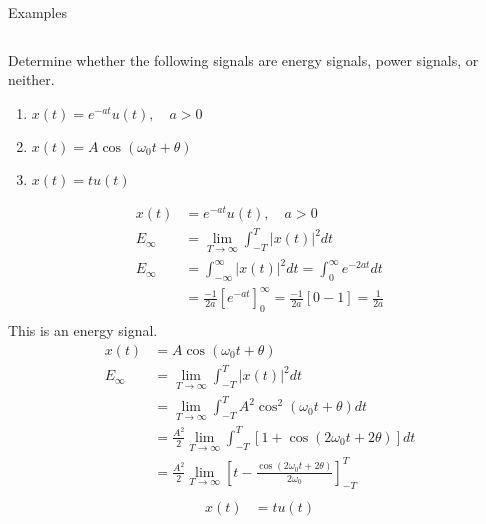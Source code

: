 \begin{frame}{Examples}
    \begin{columns}[t]
        \begin{column}{0.5\textwidth}
            Determine whether the following signals are energy signals, power signals, or neither.
            \begin{enumerate}[<alert@+>]
                \item $x(t) = e^{-at}u(t), \quad a>0$
                \item $x(t) = A\cos(\omega_0t+\theta)$
                \item $x(t) = tu(t)$
            \end{enumerate}
            \vspace{-0.2in}
            \begin{overprint}
                \begin{align*}
                    x(t) &= e^{-at}u(t), \quad a>0\\
                    E_\infty &=  \lim_{T\rightarrow \infty}\int_{-T}^{T}|x(t)|^2dt\\
                    E_\infty &=  \int_{-\infty}^{\infty}|x(t)|^2dt =  \int_{0}^{\infty}e^{-2at}dt\\
                    &= \frac{-1}{2a}\left[e^{-at}\right]_0^\infty = \frac{-1}{2a}[0 -1] = \frac{1}{2a}\\
                \end{align*}
                This is an energy signal.
                \begin{align*}
                    x(t) &= A\cos(\omega_0t+\theta)\\
                    E_\infty &=  \lim_{T\rightarrow \infty}\int_{-T}^{T}|x(t)|^2dt\\
                    &=  \lim_{T\rightarrow \infty}\int_{-T}^{T}A^2\cos^2(\omega_0t+\theta)dt\\
                    &= \frac{A^2}{2}\lim_{T\rightarrow \infty}\int_{-T}^{T}[1+ \cos(2\omega_0t+2\theta)]dt\\
                    &= \frac{A^2}{2}\lim_{T\rightarrow \infty}\left[t - \frac{\cos(2\omega_0t+2\theta)}{2\omega_0}\right]_{-T}^{T}\\
                \end{align*}
                \begin{align*}
                    x(t) &= tu(t)\\

\end{align*}
\end{overprint}
\end{column}
\end{columns}
\end{frame}
